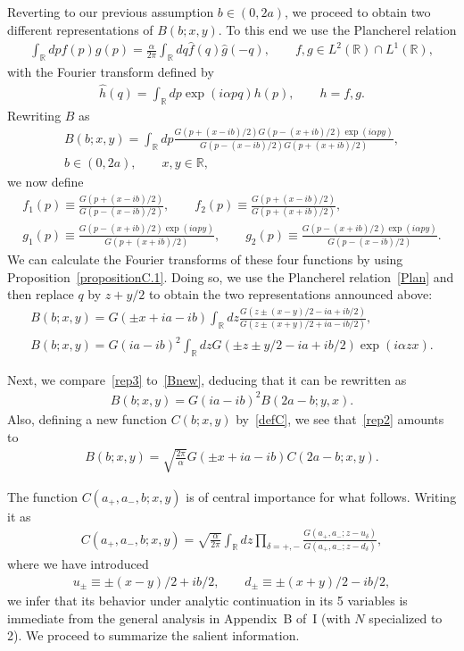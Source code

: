 \documentclass[11pt]{article}
\numberwithin{equation}{section}
\newcommand{\de}{\delta}
\newcommand{\R}{{\mathbb R}}
\newcommand{\aaa}{a_{+},a_{-}}
\begin{document}
Reverting to our previous assumption $b\in(0,2a)$, we proceed to obtain two dif\/ferent representations of $B(b;x,y)$. To this end we use the Plancherel relation
\begin{gather}\label{Plan}
\int_{\R}dpf(p)g(p)=\frac{\alpha}{2\pi}\int_{\R}dq\hat{f}(q)\hat{g}(-q),\qquad f,g\in L^2(\R)\cap L^1(\R),
\end{gather}
with the Fourier transform def\/ined by
\begin{gather}\label{Four}
\hat{h}(q)=\int_{\R}dp\exp(i\alpha pq)h(p),\qquad h=f,g.
\end{gather}
Rewriting $B$ as
\begin{gather}\label{Bnew}
B(b;x,y)=\int_{\R}dp\frac{G(p+(x-ib)/2)G(p-(x+ib)/2)\exp(i\alpha py)}{G(p-(x-ib)/2)G(p+(x+ib)/2)},\\
 b\in(0,2a),\qquad x,y\in\R,\nonumber
\end{gather}
we now def\/ine
\begin{gather}
f_1(p)\equiv\frac{G(p+(x-ib)/2)}{G(p-(x-ib)/2)},\qquad f_2(p)\equiv\frac{G(p+(x-ib)/2)}{G(p+(x+ib)/2)},
\\
g_1(p)\equiv\frac{G(p-(x+ib)/2)\exp(i\alpha py)}{G(p+(x+ib)/2)},\qquad
g_2(p)\equiv\frac{G(p-(x+ib)/2)\exp(i\alpha py)}{G(p-(x-ib)/2)}.
\end{gather}
We can calculate the Fourier transforms of these four functions by using Proposition~\ref{propositionC.1}. Doing so, we use the Plancherel relation~\eqref{Plan} and then replace $q$ by $z+y/2$ to obtain the two representations announced above:
\begin{gather}\label{rep2}
B(b;x,y)=G(\pm x +ia-ib)\int_{\R}dz \frac{G(z\pm (x-y)/2-ia+ib/2)}{G(z\pm (x+y)/2+ia-ib/2)},
\\
\label{rep3}
B(b;x,y)=G(ia-ib)^2\int_{\R}dz G(\pm z\pm y/2-ia+ib/2)\exp(i\alpha zx).
\end{gather}

Next, we compare~\eqref{rep3} to~\eqref{Bnew}, deducing that it can be rewritten as
\begin{gather}\label{BB}
B(b;x,y)=G(ia-ib)^2B(2a-b;y,x).
\end{gather}
Also, def\/ining a new function $C(b;x,y)$ by~\eqref{defC},
we see that~\eqref{rep2} amounts to
\begin{gather}\label{BC}
B(b;x,y)=\sqrt{\frac{2\pi}{\alpha}}G(\pm x +ia-ib)C(2a-b;x,y).
\end{gather}

The function $C(\aaa,b;x,y)$ is of central importance for what follows. Writing it as
\begin{gather}
C(\aaa,b;x,y)= \sqrt{\frac{\alpha}{2\pi}}\int_{\R}dz \prod_{\de=+,-}\frac{G(\aaa;z-u_{\de})}{G(\aaa;z-d_{\de})},
\end{gather}
where we have introduced
\begin{gather}
u_{\pm}\equiv \pm (x-y)/2+ib/2,\qquad d_{\pm}\equiv \pm (x+y)/2-ib/2,
\end{gather}
we infer that its behavior under analytic continuation in its 5 variables is immediate from the general analysis in Appendix~B of~I (with $N$ specialized to 2). We proceed to summarize the salient information.
\end{document}
